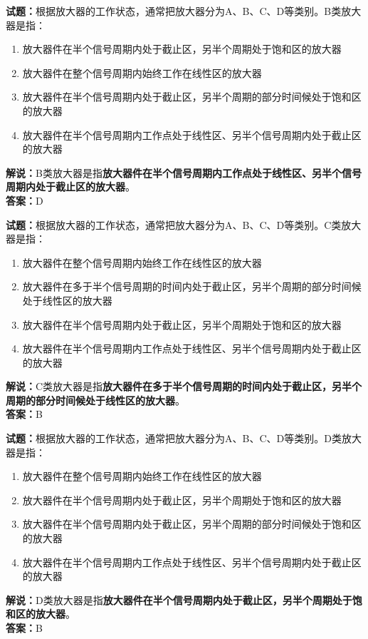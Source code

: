 \documentclass{ctexbook}
\begin{document}
\bigskip


\noindent\textbf{试题：}根据放大器的工作状态，通常把放大器分为A、B、C、D等类别。B类放大器是指：
\begin{enumerate}[leftmargin=3em]
\item 放大器件在半个信号周期内处于截止区，另半个周期处于饱和区的放大器
\item 放大器件在整个信号周期内始终工作在线性区的放大器
\item 放大器件在半个信号周期内处于截止区，另半个周期的部分时间候处于饱和区的放大器
\item 放大器件在半个信号周期内工作点处于线性区、另半个信号周期内处于截止区的放大器
\end{enumerate}
\noindent\textbf{解说：}B类放大器是指\textbf{放大器件在半个信号周期内工作点处于线性区、另半个信号周期内处于截止区的放大器}。\\\noindent\textbf{答案：}D





\bigskip


\noindent\textbf{试题：}根据放大器的工作状态，通常把放大器分为A、B、C、D等类别。C类放大器是指：
\begin{enumerate}[leftmargin=3em]
\item 放大器件在整个信号周期内始终工作在线性区的放大器
\item 放大器件在多于半个信号周期的时间内处于截止区，另半个周期的部分时间候处于线性区的放大器
\item 放大器件在半个信号周期内处于截止区，另半个周期处于饱和区的放大器
\item 放大器件在半个信号周期内工作点处于线性区、另半个信号周期内处于截止区的放大器
\end{enumerate}
\noindent\textbf{解说：}C类放大器是指\textbf{放大器件在多于半个信号周期的时间内处于截止区，另半个周期的部分时间候处于线性区的放大器}。\\\noindent\textbf{答案：}B





\bigskip


\noindent\textbf{试题：}根据放大器的工作状态，通常把放大器分为A、B、C、D等类别。D类放大器是指：
\begin{enumerate}[leftmargin=3em]
\item 放大器件在整个信号周期内始终工作在线性区的放大器
\item 放大器件在半个信号周期内处于截止区，另半个周期处于饱和区的放大器
\item 放大器件在半个信号周期内处于截止区，另半个周期的部分时间候处于饱和区的放大器
\item 放大器件在半个信号周期内工作点处于线性区、另半个信号周期内处于截止区的放大器
\end{enumerate}
\noindent\textbf{解说：}D类放大器是指\textbf{放大器件在半个信号周期内处于截止区，另半个周期处于饱和区的放大器}。\\\noindent\textbf{答案：}B
\end{document}
